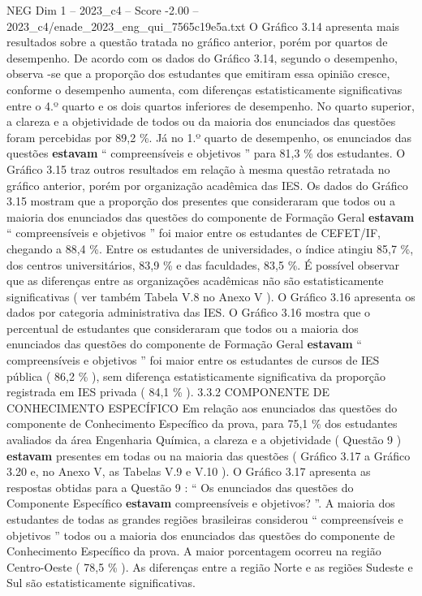 \begin{textsample}{NEG Dim 1 – 2023\_c4 – Score -2.00 – 2023\_c4/enade\_2023\_eng\_qui\_7565c19e5a.txt}
O Gráfico 3.14 apresenta mais resultados sobre a questão tratada no gráfico anterior, porém por quartos de desempenho.
De acordo com os dados do Gráfico 3.14, segundo o desempenho, observa -se que a proporção dos estudantes que emitiram essa opinião cresce, conforme o desempenho aumenta, com diferenças estatisticamente significativas entre o 4.º quarto e os dois quartos inferiores de desempenho.
No quarto superior, a clareza e a objetividade de todos ou da maioria dos enunciados das questões foram percebidas por 89,2 \%.
Já no 1.º quarto de desempenho, os enunciados das questões \textbf{estavam} “ compreensíveis e objetivos ” para 81,3 \% dos estudantes.
O Gráfico 3.15 traz outros resultados em relação à mesma questão retratada no gráfico anterior, porém por organização acadêmica das IES.
Os dados do Gráfico 3.15 mostram que a proporção dos presentes que consideraram que todos ou a maioria dos enunciados das questões do componente de Formação Geral \textbf{estavam} “ compreensíveis e objetivos ” foi maior entre os estudantes de CEFET/IF, chegando a 88,4 \%.
Entre os estudantes de universidades, o índice atingiu 85,7 \%, dos centros universitários, 83,9 \% e das faculdades, 83,5 \%.
É possível observar que as diferenças entre as organizações acadêmicas não são estatisticamente significativas ( ver também Tabela V.8 no Anexo V ).
O Gráfico 3.16 apresenta os dados por categoria administrativa das IES.
O Gráfico 3.16 mostra que o percentual de estudantes que consideraram que todos ou a maioria dos enunciados das questões do componente de Formação Geral \textbf{estavam} “ compreensíveis e objetivos ” foi maior entre os estudantes de cursos de IES pública ( 86,2 \% ), sem diferença estatisticamente significativa da proporção registrada em IES privada ( 84,1 \% ). 3.3.2 COMPONENTE DE CONHECIMENTO ESPECÍFICO Em relação aos enunciados das questões do componente de Conhecimento Específico da prova, para 75,1 \% dos estudantes avaliados da área Engenharia Química, a clareza e a objetividade ( Questão 9 ) \textbf{estavam} presentes em todas ou na maioria das questões ( Gráfico 3.17 a Gráfico 3.20 e, no Anexo V, as Tabelas V.9 e V.10 ).
O Gráfico 3.17 apresenta as respostas obtidas para a Questão 9 : “ Os enunciados das questões do Componente Específico \textbf{estavam} compreensíveis e objetivos? ”.
A maioria dos estudantes de todas as grandes regiões brasileiras considerou “ compreensíveis e objetivos ” todos ou a maioria dos enunciados das questões do componente de Conhecimento Específico da prova.
A maior porcentagem ocorreu na região Centro-Oeste ( 78,5 \% ).
As diferenças entre a região Norte e as regiões Sudeste e Sul são estatisticamente significativas.

\end{textsample}
